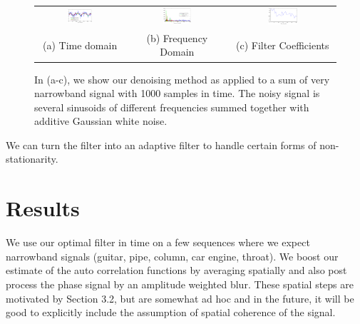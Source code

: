 \documentclass[letterpaper, 10pt]{article}
\numberwithin{equation}{section}
\begin{document}
\begin{figure}
\begin{tabular}{ccc}
\includegraphics[width=0.3\textwidth]{adaptiveFilterExplore10/timeDomain.eps} &
\includegraphics[width=0.3\textwidth]{adaptiveFilterExplore10/freqDomain.eps} &
\includegraphics[width=0.3\textwidth]{adaptiveFilterExplore10/impulseResponse.eps} \\
(a) Time domain & (b) Frequency Domain  & (c) Filter Coefficients\\
\end{tabular}
\caption{In (a-c), we show our denoising method as applied to a sum of very narrowband signal with 1000 samples in time. The noisy signal is several sinusoids of different frequencies summed together with additive Gaussian white noise.}
\end{figure}

We can turn the filter into an adaptive filter to handle certain forms of non-stationarity.


\section{Results}
We use our optimal filter in time on a few sequences where we expect narrowband signals (guitar, pipe, column, car engine, throat). We boost our estimate of the auto correlation functions by averaging spatially and also post process the phase signal by an amplitude weighted blur. These spatial steps are motivated by Section 3.2, but are somewhat ad hoc and in the future, it will be good to explicitly include the assumption of spatial coherence of the signal. 



\end{document}
